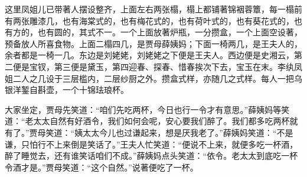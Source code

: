 \begin{parag}
    这里凤姐儿已带著人摆设整齐，上面左右两张榻，榻上都铺著锦裀蓉簟，每一榻前有两张雕漆几，也有海棠式的，也有梅花式的，也有荷叶式的，也有葵花式的，也有方的，也有圆的，其式不一。一个上面放著炉瓶，一分攒盒，一个上面空设著，预备放人所喜食物。上面二榻四几，是贾母薛姨妈；下面一椅两几，是王夫人的，余者都是一椅一几。东边是刘姥姥，刘姥姥之下便是王夫人。西边便是史湘云，第二便是宝钗，第三便是黛玉，第四迎春、探春、惜春挨次下去，宝玉在末。李纨凤姐二人之几设于三层槛内，二层纱厨之外。攒盒式样，亦随几之式样。每人一把乌银洋錾自斟壶，一个十锦珐琅杯。
\end{parag}


\begin{parag}
    大家坐定，贾母先笑道：“咱们先吃两杯，今日也行一令才有意思。”薛姨妈等笑道：“老太太自然有好酒令，我们如何会呢，安心要我们醉了。我们都多吃两杯就有了。”贾母笑道：“姨太太今儿也过谦起来，想是厌我老了。”薛姨妈笑道：“不是谦，只怕行不上来倒是笑话了。”王夫人忙笑道：“便说不上来，就便多吃一杯酒，醉了睡觉去，还有谁笑话咱们不成。”薛姨妈点头笑道：“依令。老太太到底吃一杯令酒才是。”贾母笑道：“这个自然。”说著便吃了一杯。
\end{parag}


